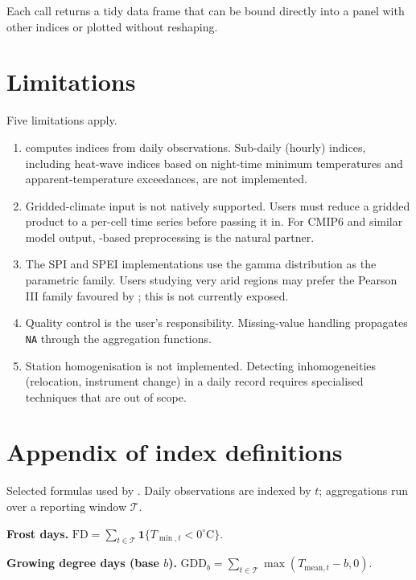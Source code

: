 Each call returns a tidy data frame that can be bound directly
into a panel with other indices or plotted without reshaping.

\section{Limitations}\label{limitations}

Five limitations apply.

\begin{enumerate}
\def\labelenumi{\arabic{enumi}.}
\tightlist
\item
   computes indices from daily observations.
  Sub-daily (hourly) indices, including heat-wave indices based
  on night-time minimum temperatures and apparent-temperature
  exceedances, are not implemented.
\item
  Gridded-climate input is not natively supported. Users must
  reduce a gridded product to a per-cell time series before
  passing it in. For CMIP6 and similar model output,
  -based preprocessing is the natural partner.
\item
  The SPI and SPEI implementations use the gamma distribution as
  the parametric family. Users studying very arid regions may
  prefer the Pearson III family favoured by
  \citet{vicente2010multiscalar}; this is not currently exposed.
\item
  Quality control is the user's responsibility. Missing-value
  handling propagates \texttt{NA} through the aggregation functions.
\item
  Station homogenisation is not implemented. Detecting
  inhomogeneities (relocation, instrument change) in a daily
  record requires specialised techniques that are out of scope.
\end{enumerate}

\section{Appendix of index definitions}\label{appendix-of-index-definitions}

Selected formulas used by . Daily observations
are indexed by \(t\); aggregations run over a reporting window
\(\mathcal{T}\).

\textbf{Frost days.} \(\mathrm{FD} = \sum_{t \in \mathcal{T}} \mathbf{1}\{T_{\min,t} < 0^\circ\mathrm{C}\}\).

\textbf{Growing degree days (base \(b\)).}
\(\mathrm{GDD}_b = \sum_{t \in \mathcal{T}} \max(T_{\mathrm{mean},t} - b, 0)\).

